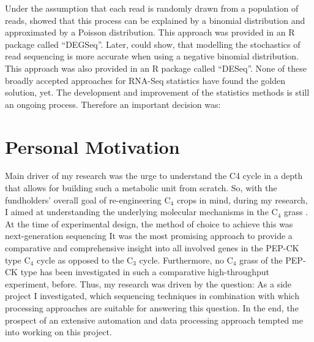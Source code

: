 Under the assumption that each read is randomly drawn from a population of reads, \cite{someone_1970} showed that this process can be explained by a binomial distribution and approximated by a Poisson distribution.
This approach was provided in an R package called "`DEGSeq"'.
Later, \cite{someoneelse_1972} could show, that modelling the stochastics of read sequencing is more accurate when using a negative binomial distribution. 
This approach was also provided in an R package called "`DESeq"'.
None of these broadly accepted approaches for RNA-Seq statistics have found the golden solution, yet.
The development and improvement of the statistics methods is still an ongoing process.
Therefore an important decision was:

\section{Personal Motivation}
Main driver of my research was the urge to understand the C4 cycle in a depth that allows for building such a metabolic unit from scratch.
So, with the fundholders' overall goal of re-engineering C$_4$ crops in mind, during my research, I aimed at understanding the underlying molecular mechanisms in the C$_4$ grass .
At the time of experimental design, the method of choice to achieve this was next-generation sequencing
It was the most promising approach to provide a comparative and comprehensive insight into all involved genes in the \ac{PEP-CK} type C$_4$ cycle as opposed to the C$_3$ cycle.
Furthermore, no C$_4$ grass of the \ac{PEP-CK} type has been investigated in such a comparative high-throughput experiment, before.
Thus, my research was driven by the question:
As a side project I investigated, which sequencing techniques in combination with which processing approaches are suitable for answering this question.
In the end, the prospect of an extensive automation and data processing approach tempted me into working on this project. %

